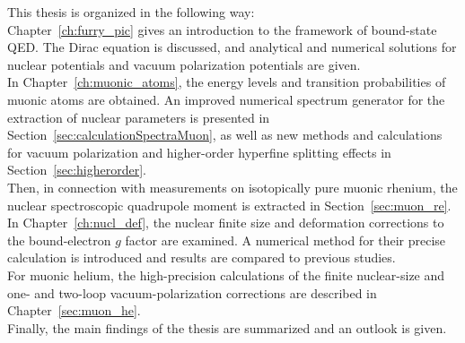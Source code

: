 This thesis is organized in the following way:\\
Chapter~\ref{ch:furry_pic} gives an introduction to the framework of bound-state QED. 
The Dirac equation is discussed, and analytical and numerical solutions for nuclear potentials and vacuum polarization potentials are given.\\
In Chapter~\ref{ch:muonic_atoms}, the energy levels and transition probabilities of muonic atoms are obtained. An improved numerical spectrum generator for the extraction of nuclear parameters is presented in Section~\ref{sec:calculationSpectraMuon}, as well as new methods and calculations for vacuum polarization and higher-order hyperfine splitting effects in Section~\ref{sec:higherorder}. \\
Then, in connection with measurements on isotopically pure muonic rhenium, the nuclear spectroscopic quadrupole moment is extracted in Section~\ref{sec:muon_re}.\\
In Chapter~\ref{ch:nucl_def}, the nuclear finite size and deformation corrections to the bound-electron $g$ factor are examined. A numerical method for their precise calculation is introduced and results are compared to previous studies.\\
For muonic helium, the high-precision calculations of the finite nuclear-size and one- and two-loop vacuum-polarization corrections are described in Chapter~\ref{sec:muon_he}.\\
Finally, the main findings of the thesis are summarized and an outlook is given.\\[11pt]
